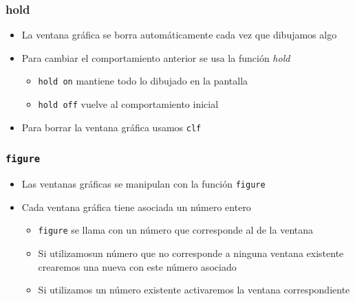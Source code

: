 \documentclass[12pt]{beamer}
\begin{document}
\begin{large}
\begin{frame}
\frametitle{hold}
\begin{itemize}
\item La ventana gráfica se borra automáticamente cada vez que
  dibujamos algo
\item Para cambiar el comportamiento anterior se usa la función
  \emph{hold}
  \begin{itemize}
    \item \texttt{hold on} mantiene todo lo dibujado en la pantalla
    \item \texttt{hold off} vuelve al comportamiento inicial
  \end{itemize}
  \item Para borrar la ventana gráfica usamos \texttt{clf}
\end{itemize}
\end{frame}

\begin{frame}
\frametitle{\texttt{figure}}
\begin{itemize}
\item Las ventanas gráficas se manipulan con la función
  \texttt{figure}
\item Cada ventana gráfica tiene asociada un número entero
  \begin{itemize}
    \item \texttt{figure} se llama con un número que corresponde al de
      la ventana
    \item Si utilizamosun número que no corresponde a ninguna ventana
      existente crearemos una nueva con este número asociado
    \item Si utilizamos un número existente activaremos la ventana
      correspondiente
  \end{itemize}
\end{itemize}
\end{frame}


\end{large}
\end{document}
